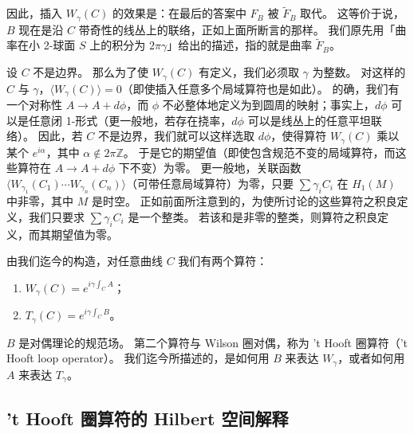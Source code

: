 因此，插入 $W_\gamma(C)$ 的效果是：在最后的答案中 $F_B$ 被 $\tilde F_B$ 取代。
这等价于说，$B$ 现在是沿 $C$ 带奇性的线丛上的联络，正如上面所断言的那样。
我们原先用「曲率在小 2-球面 $S$ 上的积分为 $2\pi\gamma$」给出的描述，指的就是曲率 $\tilde F_B$。

设 $C$ 不是边界。
那么为了使 $W_\gamma(C)$ 有定义，我们必须取 $\gamma$ 为整数。
对这样的 $C$ 与 $\gamma$，$\langle W_\gamma(C)\rangle=0$（即使插入任意多个局域算符也是如此）。
的确，我们有一个对称性 $A\to A+d\phi$，而 $\phi$ 不必整体地定义为到圆周的映射；事实上，$d\phi$ 可以是任意闭 1-形式（更一般地，若存在挠率，$d\phi$ 可以是线丛上的任意平坦联络）。
因此，若 $C$ 不是边界，我们就可以这样选取 $d\phi$，使得算符 $W_\gamma(C)$ 乘以某个 $e^{i\alpha}$，其中 $\alpha\notin2\pi\mathbb{Z}$。
于是它的期望值（即使包含规范不变的局域算符，而这些算符在 $A\to A+d\phi$ 下不变）为零。
更一般地，关联函数 $\langle W_{\gamma_1}(C_1)\cdots W_{\gamma_n}(C_n)\rangle$（可带任意局域算符）为零，只要 $\sum\gamma_iC_i$ 在 $H_1(M)$ 中非零，其中 $M$ 是时空。
正如前面所注意到的，为使所讨论的这些算符之积良定义，我们只要求 $\sum\gamma_iC_i$ 是一个整类。
若该和是非零的整类，则算符之积良定义，而其期望值为零。

由我们迄今的构造，对任意曲线 $C$ 我们有两个算符：
\begin{enumerate}
\item $W_\gamma(C)=e^{i\gamma\int_C A}$；
\item $T_\gamma(C)=e^{i\gamma\int_C B}$。
\end{enumerate}
$B$ 是对偶理论的规范场。
第二个算符与 Wilson 圈对偶，称为 't Hooft 圈算符（'t Hooft loop operator）。
我们迄今所描述的，是如何用 $B$ 来表达 $W_\gamma$，或者如何用 $A$ 来表达 $T_\gamma$。


\subsection{'t Hooft 圈算符的 Hilbert 空间解释}

